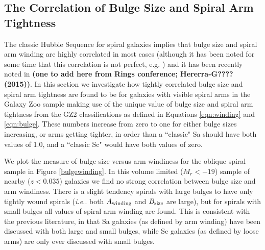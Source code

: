 \documentclass[usenatbib]{mn2e}
\newcommand{\ie}{{\it i.e.}}
\begin{document}
\subsection{The Correlation of Bulge Size and Spiral Arm Tightness}

The classic Hubble Sequence for spiral galaxies implies that bulge size and spiral arm winding are highly correlated in most cases (although it has been noted for some time that this correlation is not perfect, e.g. \citealt{1970ApJ...160..811F, Kennicutt1981}) and it has been recently noted in \citet{Davis2015,Hart2017b,Hart2018} {\bf (one to add here from Rings conference; Hererra-G???? (2015))}. In this section we investigate how tightly correlated bulge size and spiral arm tightness are found to be for galaxies with visible spiral arms in the Galaxy Zoo sample making use of the unique value of bulge size and spiral arm tightness from the GZ2 classifications as defined in Equations \ref{eqn:winding} and \ref{eqn:bulge}. These numbers increase from zero to one for either bulge sizes increasing, or arms getting tighter, in order than a ``classic" Sa should have both values of 1.0, and a ``classic Sc" would have both values of zero.  
 
 We plot the measure of bulge size versus arm windiness for the oblique spiral sample in Figure \ref{bulgewinding}. In this volume limited ($M_r<-19$) sample of nearby ($z<0.035$) galaxies we find no strong correlation between bulge size and arm windiness. There is a slight tendency spirals with large bulges to have only tightly wound spirals (\ie. both $A_{\rm winding}$ and $B_{\rm size}$ are large), but for spirals with small bulges all values of spiral arm winding are found.  This is consistent with the previous literature, in that Sa galaxies (as defined by arm winding) have been discussed with both large and small bulges, while Sc galaxies (as defined by loose arms) are only ever discussed with small bulges. 
 
\end{document}
